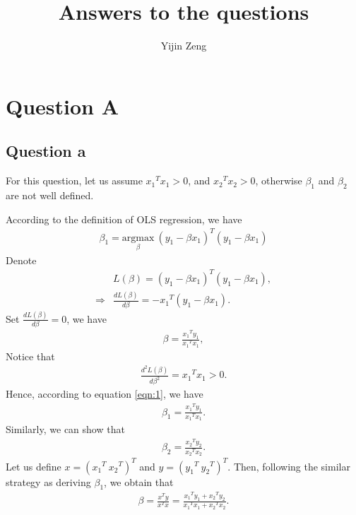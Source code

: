 \documentclass[12pt]{article}
\title{Answers to the questions}
\author{Yijin Zeng}
\date{}
\newcommand{\x}{x}
\newcommand{\y}{y}
\newcommand{\yln}[1]{y_{#1}}
\newcommand{\xln}[1]{x_{#1}}
\newcommand{\tran}[1]{{#1}^{T}}
\newcommand{\bet}{\beta}
\newcommand{\betln}[1]{\bet_{#1}}
\newcommand{\loss}[1]{L\left(#1\right)}
\begin{document}
\maketitle

\section{Question A}

\subsection{Question a}
For this question, let us assume 
$\tran{\xln{1}}\xln{1} > 0$, and $\tran{\xln{2}}\xln{2} > 0$,
otherwise $\betln{1}$ and $\betln{2}$ are not well defined.

According to the definition of OLS regression, we have
\begin{align} \label{eqn:1}
	\betln{1} = \underset{\bet}{\mathrm{argmax}}~\tran{(\yln{1} - \bet \xln{1})}(\yln{1} - \bet \xln{1})
\end{align}
Denote 
\begin{align*}
	&\loss{\bet} = \tran{(\yln{1} - \bet \xln{1})}(\yln{1} - \bet \xln{1}),\\
	\Rightarrow& \frac{d L(\beta)}{d \beta} = -\tran{\xln{1}}(\yln{1} - \bet \xln{1}).
\end{align*}
Set $\frac{d L(\beta)}{d \beta} = 0$, we have
\begin{align*}
	\beta = \frac{\tran{\xln{1}}\yln{1}}{\tran{\xln{1}}\xln{1}},
\end{align*}
Notice that
\begin{align*}
	\frac{d^2 L(\beta)}{d \beta^2} = \tran{\xln{1}}\xln{1} > 0.
\end{align*}
Hence, according to equation \eqref{eqn:1}, we have 
\begin{align*}
	\betln{1}  =  \frac{\tran{\xln{1}}\yln{1}}{\tran{\xln{1}}\xln{1}}.
\end{align*}
Similarly, we can show that
\begin{align*}
		\betln{2}  =  \frac{\tran{\xln{2}}\yln{2}}{\tran{\xln{2}}\xln{2}}.
\end{align*}
Let us define $\x = \tran{(\tran{\xln{1}}~\tran{\xln{2}}) }$
and $\y = \tran{(\tran{\yln{1}}~\tran{\yln{2}}) }$. Then, following
the similar strategy as deriving $\betln{1} $, we obtain that
\begin{align*}
	\bet =  \frac{\tran{\x}\y}{\tran{\x}\x} = \frac{\tran{\xln{1}}\yln{1} + \tran{\xln{2}}\yln{2}}{\tran{\xln{1}}\xln{1} + \tran{\xln{2}}\xln{2}}. 
\end{align*}
\end{document}
